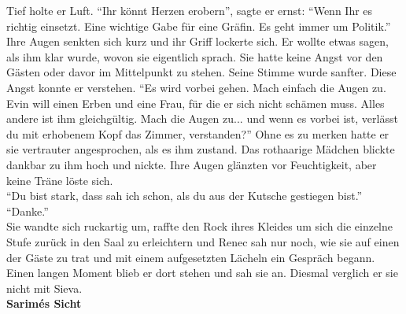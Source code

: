 Tief holte er Luft. ``Ihr könnt Herzen erobern'', sagte er 
ernst: ``Wenn Ihr es richtig einsetzt. Eine wichtige Gabe für eine Gräfin. Es geht immer um 
Politik.''
Ihre Augen senkten sich kurz und ihr Griff lockerte sich. Er wollte etwas sagen, als ihm klar 
wurde, wovon sie eigentlich sprach. Sie hatte keine Angst vor den Gästen oder davor im Mittelpunkt 
zu stehen. Seine Stimme wurde sanfter. Diese Angst konnte er verstehen. ``Es wird vorbei gehen. 
Mach einfach die Augen zu. Evin will einen Erben und eine Frau, für die er sich nicht schämen muss. 
Alles andere ist ihm gleichgültig. Mach die Augen zu... und wenn es vorbei ist, verlässt du mit 
erhobenem Kopf das Zimmer, verstanden?'' Ohne es zu merken hatte er sie vertrauter angesprochen, 
als es ihm zustand. Das rothaarige Mädchen blickte dankbar zu ihm hoch und nickte. Ihre Augen 
glänzten vor Feuchtigkeit, aber keine Träne löste sich.\\
``Du bist stark, dass sah ich schon, als du aus der Kutsche gestiegen bist.''\\
``Danke.''\\
Sie wandte sich ruckartig um, raffte den Rock ihres Kleides um sich die einzelne Stufe zurück in 
den Saal zu erleichtern und Renec sah nur noch, wie sie auf einen der Gäste zu trat und mit einem 
aufgesetzten Lächeln ein Gespräch begann. Einen langen Moment blieb er dort stehen und sah sie an. 
Diesmal verglich er sie nicht mit Sieva. \\


\textbf{Sarimés Sicht}

